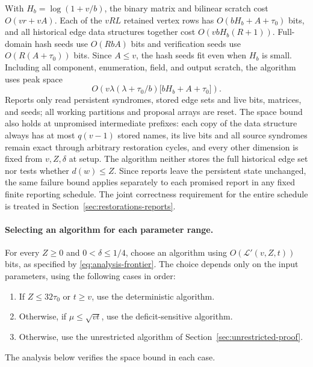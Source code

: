 \documentclass[11pt,letterpaper]{article}
\numberwithin{equation}{section}
\begin{document}
With $H_b=\log(1+v/b)$, the binary matrix and bilinear scratch cost $O(vr+vA)$.
Each of the $vRL$ retained vertex rows has $O(bH_b+A+\tau_0)$ bits, and all historical edge data structures together cost $O(vbH_b(R+1))$.
Full-domain hash seeds use $O(RbA)$ bits and verification seeds use $O(R(A+\tau_0))$ bits.
Since $A\le v$, the hash seeds fit even when $H_b$ is small.
Including all component, enumeration, field, and output scratch, the algorithm uses peak space
\begin{equation}
O\left(v\lambda(\lambda+\tau_0/b)
             \bigl[bH_b+A+\tau_0\bigr]\right).                      \label{eq:forest-df11}
\end{equation}
Reports only read persistent syndromes, stored edge sets and live bits, matrices, and seeds; all working partitions and proposal arrays are reset.
The space bound also holds at unpromised intermediate prefixes: each copy of the data structure always has at most $q(v-1)$ stored names, its live bits and all source syndromes remain exact through arbitrary restoration cycles, and every other dimension is fixed from $v,Z,\delta$ at setup.
The algorithm neither stores the full historical edge set nor tests whether $d(w)\le Z$.
Since reports leave the persistent state unchanged, the same failure bound applies separately to each promised report in any fixed finite reporting schedule.
The joint correctness requirement for the entire schedule is treated in Section~\ref{sec:restorations-reports}.

\paragraph{Selecting an algorithm for each parameter range.}
For every $Z\ge0$ and $0<\delta\le1/4$, choose an algorithm using $O(\mathcal L'(v,Z,t))$ bits, as specified by \eqref{eq:analysis-frontier}.
The choice depends only on the input parameters, using the following cases in order:
\begin{enumerate}
\item If $Z\le32\tau_0$ or $t\ge v$, use the deterministic algorithm.
\item Otherwise, if $\mu\le\sqrt{vt}$, use the deficit-sensitive algorithm.
\item Otherwise, use the unrestricted algorithm of Section~\ref{sec:unrestricted-proof}.
\end{enumerate}
The analysis below verifies the space bound in each case.
\end{document}
